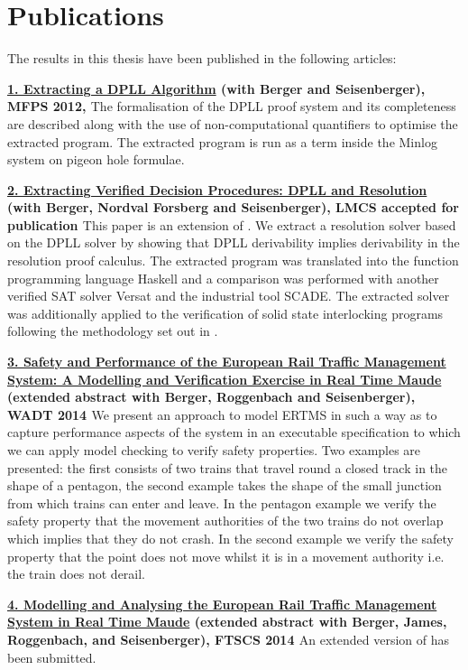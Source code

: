 \section{Publications}

The results in this thesis have been published in the following articles:

\textbf{\ul{1. Extracting a DPLL Algorithm} (with Berger and Seisenberger), MFPS 2012, \cite{AL12}}
The formalisation of the DPLL proof system and its completeness are described along with the use of non-computational quantifiers to optimise the extracted program. The extracted program is run as a term inside the Minlog system on pigeon hole formulae.


\textbf{\ul{2. Extracting Verified Decision Procedures: DPLL and Resolution} (with Berger, Nordval Forsberg and Seisenberger), LMCS accepted for publication \cite{AL14b}}
This paper is an extension of \cite{AL12}. We extract a resolution solver based on the DPLL solver by showing that DPLL derivability implies derivability in the resolution proof calculus. The extracted program was translated into the function programming language Haskell and a comparison was performed with another verified SAT solver Versat and the industrial tool SCADE. The extracted solver was additionally applied to the verification of solid state interlocking programs following the methodology set out in \cite{AL14a}.



\textbf{\ul{3. Safety and Performance of the European Rail Traffic Management System: A Modelling and Verification Exercise in Real Time Maude} (extended abstract with Berger, Roggenbach and Seisenberger), WADT 2014 \cite{AL14c}} We present an approach to model ERTMS in such a way as to capture performance aspects of the system in an executable specification to which we can apply model checking to verify safety properties. Two examples are presented: the first consists of two trains that travel round a closed track in the shape of a pentagon, the second example takes the shape of the small junction from which trains can enter and leave. In the pentagon example we verify the safety property that the movement authorities of the two trains do not overlap which implies that they do not crash. In the second example we verify the safety property that the point does not move whilst it is in a movement authority i.e. the train does not derail.

\textbf{\ul{4. Modelling and Analysing the European Rail Traffic Management System in Real Time Maude} (extended abstract with Berger, James, Roggenbach, and Seisenberger), FTSCS 2014 \cite{AL14d}} An extended version of \cite{AL14c} has been submitted.



